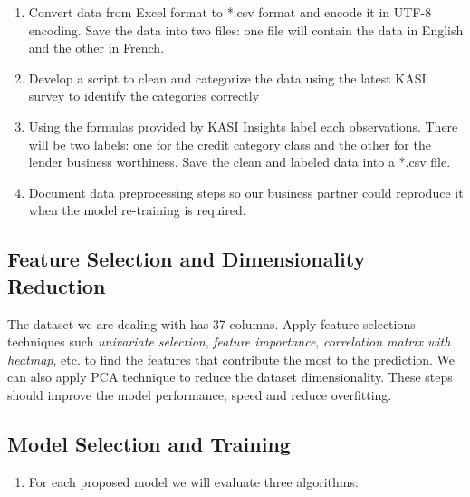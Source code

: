 \begin{enumerate}
\def\labelenumi{\arabic{enumi}.}
\tightlist
\item
  Convert data from Excel format to *.csv format and encode it in UTF-8
  encoding. Save the data into two files: one file will contain the data
  in English and the other in French.
\item
  Develop a script to clean and categorize the data using the latest
  KASI survey to identify the categories correctly
\item
  Using the formulas provided by KASI Insights label each observations.
  There will be two labels: one for the credit category class and the
  other for the lender business worthiness. Save the clean and labeled
  data into a *.csv file.
\item
  Document data preprocessing steps so our business partner could
  reproduce it when the model re-training is required.
\end{enumerate}

\hypertarget{feature-selection-and-dimensionality-reduction}{%
\subsection{Feature Selection and Dimensionality
Reduction}\label{feature-selection-and-dimensionality-reduction}}

The dataset we are dealing with has 37 columns. Apply feature selections
techniques such \emph{univariate selection}, \emph{feature importance},
\emph{correlation matrix with heatmap}, etc. to find the features that
contribute the most to the prediction. We can also apply PCA technique
to reduce the dataset dimensionality. These steps should improve the
model performance, speed and reduce overfitting.

\hypertarget{model-selection-and-training}{%
\subsection{Model Selection and
Training}\label{model-selection-and-training}}

\begin{enumerate}
\def\labelenumi{\arabic{enumi}.}
\tightlist
\item
  For each proposed model we will evaluate three algorithms:
\end{enumerate}

